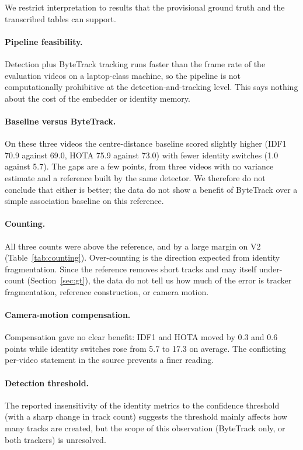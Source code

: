 \documentclass[11pt]{article}
\begin{document}
We restrict interpretation to results that the provisional ground truth and the transcribed tables can support.

\paragraph{Pipeline feasibility.} Detection plus ByteTrack tracking runs faster than the frame rate of the evaluation videos on a laptop-class machine, so the pipeline is not computationally prohibitive at the detection-and-tracking level. This says nothing about the cost of the embedder or identity memory.

\paragraph{Baseline versus ByteTrack.} On these three videos the centre-distance baseline scored slightly higher (IDF1 70.9 against 69.0, HOTA 75.9 against 73.0) with fewer identity switches (1.0 against 5.7). The gaps are a few points, from three videos with no variance estimate and a reference built by the same detector. We therefore do not conclude that either is better; the data do not show a benefit of ByteTrack over a simple association baseline on this reference.

\paragraph{Counting.} All three counts were above the reference, and by a large margin on V2 (Table~\ref{tab:counting}). Over-counting is the direction expected from identity fragmentation. Since the reference removes short tracks and may itself under-count (Section~\ref{sec:gt}), the data do not tell us how much of the error is tracker fragmentation, reference construction, or camera motion.

\paragraph{Camera-motion compensation.} Compensation gave no clear benefit: IDF1 and HOTA moved by 0.3 and 0.6 points while identity switches rose from 5.7 to 17.3 on average. The conflicting per-video statement in the source prevents a finer reading.

\paragraph{Detection threshold.} The reported insensitivity of the identity metrics to the confidence threshold (with a sharp change in track count) suggests the threshold mainly affects how many tracks are created, but the scope of this observation (ByteTrack only, or both trackers) is unresolved.
\end{document}
